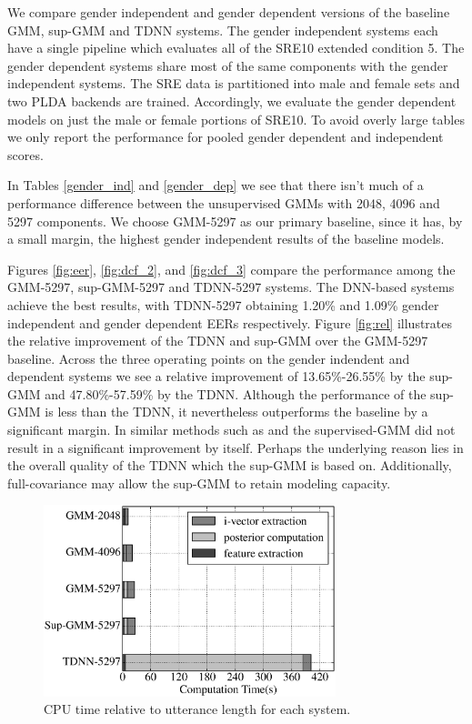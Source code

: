 \documentclass{article}
\begin{document}
We compare gender independent and gender dependent versions of the
baseline GMM, sup-GMM and TDNN systems. The gender independent
systems each have a single pipeline which evaluates all of the SRE10
extended condition 5. The gender dependent systems share most of the
same components with the gender independent systems. 
The SRE data is partitioned into male and female sets and two PLDA
backends are trained. Accordingly, we evaluate the gender
dependent models on just the male or female portions of SRE10. To avoid 
overly large
tables we only report the performance for pooled gender dependent
and independent scores.

In Tables \ref{gender_ind} and \ref{gender_dep} we see that there
isn't much of a performance difference between
the unsupervised GMMs with 2048, 4096 and 5297 components. 
We choose GMM-5297 as our primary baseline, since it has, by a small margin,
the highest gender independent results of the baseline models.

Figures \ref{fig:eer}, \ref{fig:dcf_2}, and \ref{fig:dcf_3}
compare the performance among the GMM-5297,
sup-GMM-5297 and TDNN-5297 systems. The DNN-based systems achieve the
best results, with TDNN-5297 obtaining 1.20\% and 1.09\%
gender independent and gender dependent EERs respectively.
Figure \ref{fig:rel} illustrates the relative improvement of the
TDNN and sup-GMM over the GMM-5297 baseline. Across the three
operating points on the gender indendent and dependent systems we 
see a relative improvement of 13.65\%-26.55\%
by the sup-GMM and 47.80\%-57.59\% by the TDNN. Although
the performance of the sup-GMM is less than the TDNN,
it nevertheless outperforms the baseline by a significant
margin. In similar methods such as \cite{lei2014} and \cite{omar2010}
the supervised-GMM did not result in a significant improvement by
itself. Perhaps the underlying reason lies in the overall quality of
the TDNN which the sup-GMM is based on. Additionally, 
full-covariance may allow the sup-GMM to retain modeling capacity.

\begin{figure}[t]
\centerline{\includegraphics[width=8.5cm]{fig/time}}
\caption{CPU time relative to utterance length for each system.}
\label{fig:time}
\end{figure}
\end{document}
